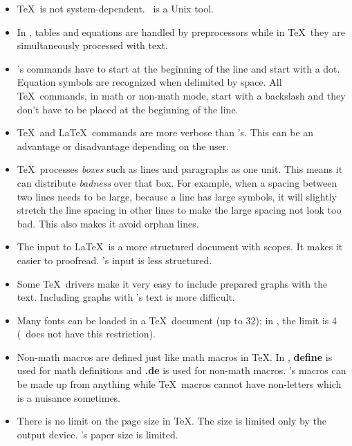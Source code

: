 \begin{itemize}
\item \TeX\ is not system-dependent. \Troff\ is a Unix tool.

\item In \Troff, tables and equations are handled by preprocessors
while in \TeX\ they are simultaneously processed with text.

\item \Troff's commands have to start at the beginning of the line
and start with a dot. Equation symbols are recognized when delimited by space.
All \TeX\ commands, in math or non-math mode, start with a backslash
and they don't have to be placed at the beginning of the line.

\item \TeX\ and \LaTeX\ commands are more verbose than \troff's.
This can be an advantage or disadvantage depending on the user.

\item \TeX\ processes {\it boxes} such as lines and paragraphs as one unit.
This means it can distribute {\it badness} over that box.
For example, when a spacing between two lines needs to be large, because
a line has large symbols, it will slightly stretch the
line spacing in other lines to make the large spacing not look
too bad. This also makes it avoid orphan lines.

\item The input to \LaTeX\ is a more structured document with scopes. It makes it
easier to proofread. \Troff's input is less structured.

\item Some  \TeX\ drivers make it very easy to include prepared
graphs with the text. Including graphs with \troff's text is more difficult.

\item Many fonts can be loaded in a \TeX\ document (up to 32); in \troff,
the limit is 4 (\ditroff\ does not have this restriction).

\item Non-math macros are defined just like math macros in \TeX.
In \troff, {\bf define} is used for math definitions and {\bf .de} is
used for non-math macros.
\Troff's macros can be made up from anything while
\TeX\ macros cannot have non-letters which is a nuisance sometimes.

\item There is no limit on the page size in \TeX. The size is limited only by
the output device. \Troff's paper size is limited.


\end{itemize}
